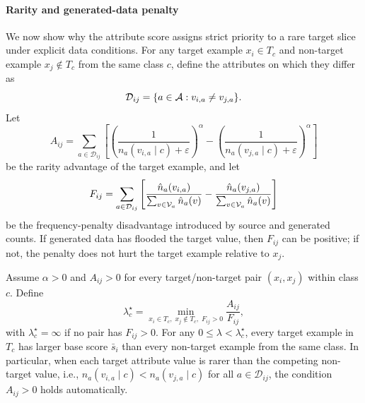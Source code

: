 \paragraph{Rarity and generated-data penalty}
We now show why the attribute score assigns strict priority to a rare target slice under explicit data conditions. For any target example $x_i\in T_c$ and non-target example $x_j\notin T_c$ from the same class $c$, define the attributes on which they differ as
\begin{equation}
\label{eq:target-difference-attributes}
\mathcal{D}_{ij}=\{a\in\mathcal{A}: v_{i,a}\neq v_{j,a}\}.
\end{equation}
Let
\begin{equation}
\label{eq:rarity-advantage}
A_{ij}
=
\sum_{a\in\mathcal{D}_{ij}}
\left[
\left(\frac{1}{n_a(v_{i,a}\mid c)+\varepsilon}\right)^\alpha
-
\left(\frac{1}{n_a(v_{j,a}\mid c)+\varepsilon}\right)^\alpha
\right]
\end{equation}
be the rarity advantage of the target example, and let
\begin{equation}
\label{eq:frequency-disadvantage}
F_{ij}
=
\sum_{a\in\mathcal{D}_{ij}}
\left[
\frac{\hat{n}_a(v_{i,a})}{\sum_{v\in\mathcal{V}_a}\hat{n}_a(v)}
-
\frac{\hat{n}_a(v_{j,a})}{\sum_{v\in\mathcal{V}_a}\hat{n}_a(v)}
\right]
\end{equation}
be the frequency-penalty disadvantage introduced by source and generated counts. If generated data has flooded the target value, then $F_{ij}$ can be positive; if not, the penalty does not hurt the target example relative to $x_j$.

\begin{tcolorbox}[
    colback=blue!2!white,
    colframe=blue!20!white,
    arc=3pt,
    boxrule=1pt,
    drop shadow,
    breakable
]
\begin{proposition}
\label{prop:rarity-margin}
Assume $\alpha>0$ and $A_{ij}>0$ for every target/non-target pair $(x_i,x_j)$ within class $c$. Define
\begin{equation}
\label{eq:lambda-star}
\lambda_c^\star
=
\min_{x_i\in T_c,\;x_j\notin T_c,\;F_{ij}>0}
\frac{A_{ij}}{F_{ij}},
\end{equation}
with $\lambda_c^\star=\infty$ if no pair has $F_{ij}>0$. For any $0\leq\lambda<\lambda_c^\star$, every target example in $T_c$ has larger base score $\bar{s}_i$ than every non-target example from the same class. In particular, when each target attribute value is rarer than the competing non-target value, i.e., $n_a(v_{i,a}\mid c)<n_a(v_{j,a}\mid c)$ for all $a\in\mathcal{D}_{ij}$, the condition $A_{ij}>0$ holds automatically.
\end{proposition}
\end{tcolorbox}

